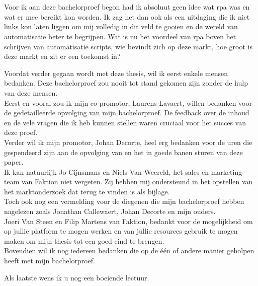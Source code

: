 
\chapter*{}
\label{ch:voorwoord}

Voor ik aan deze bachelorproef begon had ik absoluut geen idee wat \acrlong{rpa} was en wat er mee bereikt kon worden. Ik zag het dan ook als een uitdaging die ik niet links kon laten liggen om mij volledig in dit veld te gooien en de wereld van automatisatie beter te begrijpen. Wat is nu het voordeel van \acrshort{rpa} boven het schrijven van automatisatie scripts, wie bevindt zich op deze markt, hoe groot is deze markt en zit er een toekomst in?

Voordat verder gegaan wordt met deze thesis, wil ik eerst enkele mensen bedanken. Deze bachelorproef zou nooit tot stand gekomen zijn zonder de hulp van deze mensen.\\
Eerst en vooral zou ik mijn co-promotor, Laurens Lavaert, willen bedanken voor de gedetailleerde
opvolging van mijn bachelorproef. De feedback over de inhoud en de vele vragen die ik heb kunnen stellen waren cruciaal voor het succes van deze proef.\\
Verder wil ik mijn promotor, Johan Decorte, heel erg bedanken voor de uren die
gespendeerd zijn aan de opvolging van en het in goede banen sturen van deze paper.\\
Ik kan natuurlijk Jo Cijnsmans en Niels Van Weereld, het sales en marketing team van Faktion niet vergeten. Zij hebben mij ondersteund in het opstellen van het marktonderzoek dat terug te vinden is als bijlage.\\
Toch ook nog een vermelding voor de diegenen die mijn bachelorproef hebben nagelezen zoals Jonathan Callewaert, Johan Decorte en mijn ouders.\\
Joeri Van Steen en Filip Martens van Faktion, bedankt voor de mogelijkheid om op jullie platform te mogen werken en van jullie resources gebruik te mogen maken om mijn thesis tot een goed eind te brengen. \\
Bovendien wil ik nog iedereen bedanken die op de één of andere manier geholpen heeft met mijn bachelorproef.

Als laatste wens ik u nog een boeiende lectuur.

